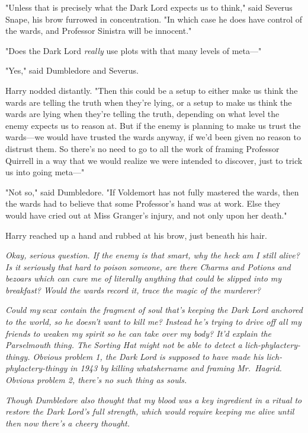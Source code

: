 "Unless that is precisely what the Dark Lord expects us to think," said Severus
Snape, his brow furrowed in concentration. "In which case he does have control
of the wards, and Professor Sinistra will be innocent."

"Does the Dark Lord \emph{really} use plots with that many levels of meta\mbox{---}"

"Yes," said Dumbledore and Severus.

Harry nodded distantly. "Then this could be a setup to either make us think the
wards are telling the truth when they're lying, or a setup to make us think the
wards are lying when they're telling the truth, depending on what level the
enemy expects us to reason at. But if the enemy is planning to make us trust
the wards---we would have trusted the wards anyway, if we'd been given no
reason to distrust them. So there's no need to go to all the work of framing
Professor Quirrell in a way that we would realize we were intended to discover,
just to trick us into going meta\mbox{---}"

"Not so," said Dumbledore. "If Voldemort has not fully mastered the wards, then
the wards had to believe that some Professor's hand was at work. Else they
would have cried out at Miss Granger's injury, and not only upon her death."

Harry reached up a hand and rubbed at his brow, just beneath his hair.

\emph{Okay, serious question. If the enemy is that smart, why the heck am I
still alive? Is it seriously that hard to poison someone, are there Charms and
Potions and bezoars which can cure me of literally anything that could be
slipped into my breakfast? Would the wards record it, trace the magic of the
murderer?}

\emph{Could my} scar \emph{contain the fragment of soul that's keeping the Dark
Lord anchored to the world, so he doesn't want to kill me? Instead he's trying
to drive off all my friends to weaken my spirit so he can take over my body?
It'd explain the Parselmouth thing. The Sorting Hat might not be able to detect
a lich-phylactery-thingy. Obvious problem 1, the Dark Lord is supposed to have
made his lich-phylactery-thingy in 1943 by killing whatshername and framing
Mr.~Hagrid. Obvious problem 2, there's no such thing as souls.}

\emph{Though Dumbledore also thought that my blood was a key ingredient in a
ritual to restore the Dark Lord's full strength, which would require keeping me
alive until then{\el} now there's a cheery thought.}

